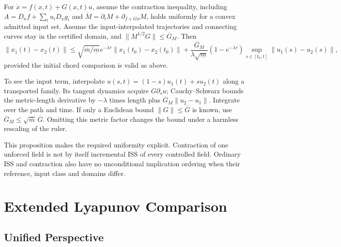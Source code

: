 \begin{proposition}
\label{prop:ch4:contraction-iss}
For $\dot x=f(x,t)+G(x,t)u$, assume the contraction inequality, including $A=D_xf+\sum_i u_iD_xg_i$ and $\dot M=\partial_tM+\partial_{f+Gu}M$, holds uniformly for a convex admitted input set. Assume the input-interpolated trajectories and connecting curves stay in the certified domain, and $\|M^{1/2}G\|\leq\overline G_M$. Then
\begin{equation}
\|x_1(t)-x_2(t)\|\leq\sqrt{\overline m/\underline m}e^{-\lambda\tau}
\|x_1(t_0)-x_2(t_0)\|+
\frac{\overline G_M}{\lambda\sqrt{\underline m}}(1-e^{-\lambda\tau})
\sup_{s\in[t_0,t]}\|u_1(s)-u_2(s)\|,
\label{eq:ch4:diff-ISS-bound}
\end{equation}
provided the initial chord comparison is valid as above.
\end{proposition}

To see the input term, interpolate $u(s,t)=(1-s)u_1(t)+su_2(t)$ along a transported family. Its tangent dynamics acquire $G\partial_su$; Cauchy--Schwarz bounds the metric-length derivative by $-\lambda$ times length plus $\overline G_M\|u_2-u_1\|$. Integrate over the path and time. If only a Euclidean bound $\|G\|\leq\overline G$ is known, use $\overline G_M\leq\sqrt{\overline m}\,\overline G$. Omitting this metric factor changes the bound under a harmless rescaling of the ruler.

This proposition makes the required uniformity explicit. Contraction of one unforced field is not by itself incremental ISS of every controlled field. Ordinary ISS and contraction also have no unconditional implication ordering when their reference, input class and domains differ.

\section{Extended Lyapunov Comparison}

\subsection{Unified Perspective}

